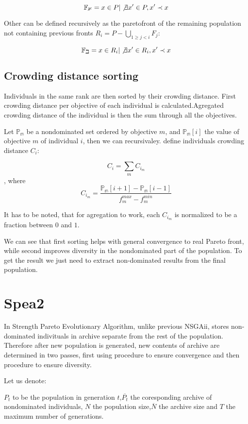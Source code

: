 \documentclass[12pt,oneside]{fithesis2}
\begin{document}
$$\mathbb{F_1} = {x \in P | \not \exists x' \in P, x' \prec x} $$

Other can be defined recursively as the paretofront of the remaining population not containing previous fronts $R_i = P - \bigcup\limits_{1\geq j < i} F_j$:

$$\mathbb{F_i} = {x \in R_i | \not \exists x' \in R_i, x' \prec x} $$

\subsection{Crowding distance sorting}

Individuals in the same rank are then sorted by their crowding distance. First crowding distance per objective of each individual is calculated.Agregated crowding distance of the individual is then the sum through all the objectives.

Let $\mathbb{P_m}$ be a nondominated set ordered by objective $m$, and $\mathbb{P_m}[i]$ the value of objective $m$ of individual $i$, then we can recursivaley. define individuals crowding distance $C_i$:

$$C_i = \sum\limits_{m} C_{i_m} $$, where $$C_{i_m} = \frac{\mathbb{P_m}[i+1] - \mathbb{P_m}[i-1]}{f^{max}_m - f^{min}_m}$$

It has to be noted, that for agregation to work, each $C_{i_m}$ is normalized to be a fraction between $0$ and $1$. 

We can see that first sorting helps with general convergence to real Pareto front, while second improves diversity in the nondominated part of the population. To get the result we just need to extract non-dominated results from the final population. 

\section{Spea2}
In Strength Pareto Evolutionary Algorithm\cite{zitzler2001spea2}, unlike previous NSGAii, stores non-dominated indivituals in archive separate from the rest of the population. Therefore after new population is generated, new contents of archive are determined in two passes, first using procedure to ensure convergence and then procedure to ensure diversity.

Let us denote:

$P_t$ to be the population in generation $t$,$\overline{P_t}$ the coresponding archive of nondominated individuals, $N$ the population size,$\overline N$ the archive size and $T$ the maximum number of generations.
\end{document}
